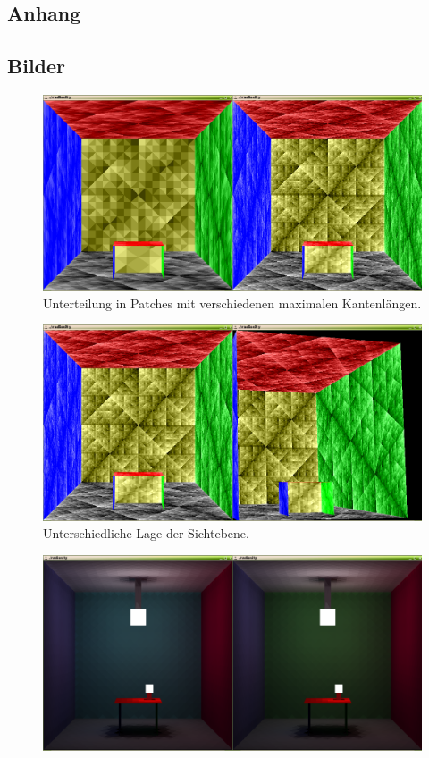 \documentclass[final,a4paper,11pt,notitlepage,halfparskip]{scrreprt}
\begin{document}
\begin{appendix}
\chapter{Anhang}
\section{Bilder}
  \begin{figure}[htb]
    \centering
    \includegraphics[width=12cm]{img/patches.png}
    \caption{Unterteilung in Patches mit verschiedenen maximalen Kantenlängen.}
    \label{fig:patches}
  \end{figure}
  \begin{figure}[htb]
    \centering
    \includegraphics[width=12cm]{img/view.png}
    \caption{Unterschiedliche Lage der Sichtebene.}
    \label{fig:view}
  \end{figure}
  \begin{figure}[htb]
    \centering
    \includegraphics[width=12cm]{img/wrong_ff.png}

\end{figure}
\end{appendix}
\end{document}
